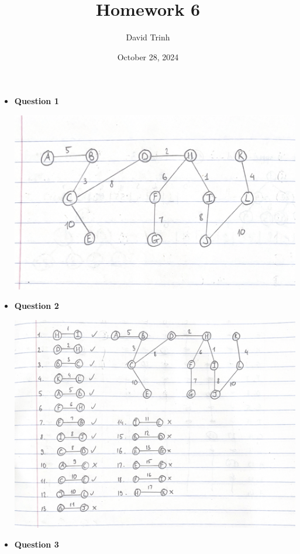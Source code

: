 \documentclass{article}
\title{Homework 6}
\author{David Trinh}
\date{October 28, 2024}
\begin{document}
\maketitle

\begin{itemize}

    \item\textbf{Question 1}

        \includegraphics[scale=0.25]{HW6_Q1.png}

    \item\textbf{Question 2}

        \includegraphics[scale=0.5]{HW6_Q2.png}

    \item\textbf{Question 3}


\end{itemize}
\end{document}
